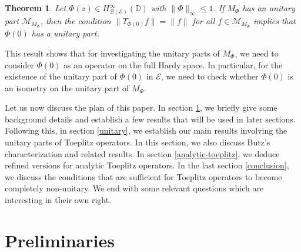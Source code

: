 \documentclass[12pt]{amsart}
\numberwithin{equation}{section}
\newtheorem*{thm*}{Theorem}
\theoremstyle{definition}
\newcommand{\D}{\mathbb{D}}
\newcommand{\1}{{\mbox{\bf 1}}}
\newcommand{\clb}{\mathcal{B}}
\newcommand{\cle}{\mathcal{E}}
\newcommand{\clm}{\mathcal{M}}
\begin{document}
\begin{thm*}
Let $\Phi(z) \in H_{\clb(\cle)}^{\infty}(\D)$ with $\|\Phi\|_{\infty} \leq 1$.  If $M_{\Phi}$ has an unitary part $\clm_{M_{\Phi}}$, then the condition $\|T_{\Phi(0)} f \| = \|f\|$ for all $f \in \clm_{M_{\Phi}}$ implies that $\Phi(0)$ has a  unitary part.
\end{thm*}
This result shows that for investigating the unitary parts of $M_{\Phi}$, we need to consider $\Phi(0)$ as an operator on the full Hardy space. In particular,  for the existence of the unitary part of $\Phi(0)$ in $\cle$, we need to check whether $\Phi(0)$ is an isometry on the unitary part of $M_{\Phi}$.


Let us now discuss the plan of this paper. In section \ref{preliminaries}, we briefly give some background details and establish a few results that will be used in later sections. Following this, in section \ref{unitary}, we establish our main results involving the unitary parts of Toeplitz operators. In this section, we also discuss Butz's characterization and related results. In section \ref{analytic-toeplitz}, we deduce refined versions for analytic Toeplitz operators.  In the last section \ref{conclusion}, we discuss the conditions that are sufficient for Toeplitz operators to become completely non-unitary. We end with some relevant questions which are interesting in their own right.


\section{Preliminaries}\label{preliminaries}
\end{document}
